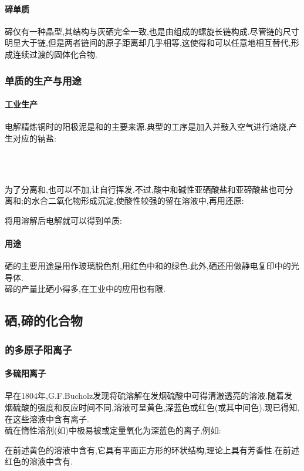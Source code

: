 \documentclass{ctexart}
\begin{document}
\paragraph{碲单质}
碲仅有一种晶型,其结构与灰硒完全一致,也是由组成的螺旋长链构成.尽管链的尺寸明显大于链,但是两者链间的原子距离却几乎相等,这使得和可以任意地相互替代,形成连续过渡的固体化合物.
\subsubsection{单质的生产与用途}
\paragraph{工业生产}
电解精炼铜时的阳极泥是和的主要来源.典型的工序是加入并鼓入空气进行焙烧,产生对应的钠盐:
\begin{center}
    \\
    \\
\end{center}
为了分离和,也可以不加,让自行挥发.不过,酸中和碱性亚硒酸盐和亚碲酸盐也可分离和;的水合二氧化物形成沉淀,使酸性较强的留在溶液中,再用还原:
\begin{center}
\end{center}
将用溶解后电解就可以得到单质:
\begin{center}
\end{center}
\paragraph{用途}
硒的主要用途是用作玻璃脱色剂,用红色中和的绿色.此外,硒还用做静电复印中的光导体.\\
\indent 碲的产量比硒小得多,在工业中的应用也有限.
\subsection{硒,碲的化合物}
\subsubsection{的多原子阳离子}
\paragraph{多硫阳离子}早在1804年,G.F.Bucholz发现将硫溶解在发烟硫酸中可得清澈透亮的溶液.随着发烟硫酸的强度和反应时间不同,溶液可呈黄色,深蓝色或红色(或其中间色).现已得知,在这些溶液中含有离子.\\
\indent 硫在惰性溶剂(如)中极易被或定量氧化为深蓝色的离子,例如:
\begin{center}
\end{center}
在前述黄色的溶液中含有,它具有平面正方形的环状结构,理论上具有芳香性.在前述红色的溶液中含有.
\end{document}
